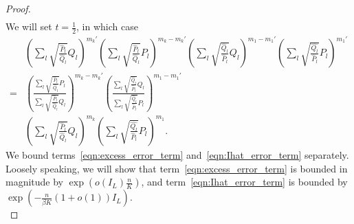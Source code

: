\documentclass{article}
\begin{document}
\begin{proof}
\begin{align*}
\end{align*}
We will set $t = \frac{1}{2}$, in which case
\begin{align}
& \left( \sum_l \sqrt{\frac{\hat{P}_l}{\hat{Q}_l} } Q_l \right)^{m_k'}
 \left( \sum_l \sqrt{\frac{\hat{P}_l}{\hat{Q}_l} } P_l \right)^{m_k - m_k'}
 \left( \sum_l \sqrt{\frac{\hat{Q}_l}{\hat{P}_l} } Q_l \right)^{m_1 - m_1'}
       \left( \sum_l \sqrt{\frac{\hat{Q_l}}{\hat{P}_l} } P_l \right)^{m_1'} \nonumber \\
=&  \left( \frac{\sum_l \sqrt{\frac{\hat{P}_l}{\hat{Q}_l} } P_l}
                {\sum_l \sqrt{\frac{\hat{P}_l}{\hat{Q}_l} } Q_l}  \right)^{m_k - m_k'}
 \left( \frac{ \sum_l \sqrt{\frac{\hat{Q}_l}{\hat{P}_l} } Q_l}
             { \sum_l \sqrt{\frac{\hat{Q}_l}{\hat{P}_l} } P_l} \right)^{m_1 - m_1'}  
   \label{eqn:excess_error_term} \\
 & \left( \sum_l \sqrt{ \frac{\hat{P}_l}{\hat{Q}_l}} Q_l \right)^{m_k} 
    \left( \sum_l \sqrt{\frac{\hat{Q_l}}{\hat{P}_l} } P_l \right)^{m_1}.
   \label{eqn:Ihat_error_term} 
\end{align} 
We bound terms~\eqref{eqn:excess_error_term} and~\eqref{eqn:Ihat_error_term} separately. Loosely speaking, we will show that term~\eqref{eqn:excess_error_term} is bounded in magnitude by $\exp( o(I_L) \frac{n}{K} )$, and term~\eqref{eqn:Ihat_error_term} is bounded by $\exp( - \frac{n}{\beta K} (1 + o(1) )I_L)$.\\ 


\end{proof}
\end{document}
